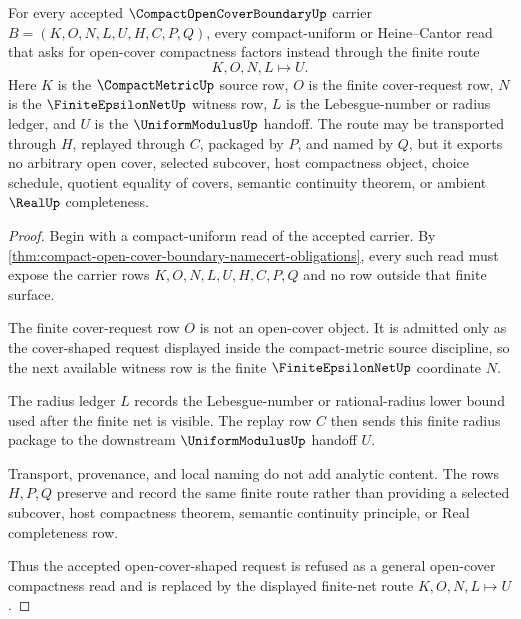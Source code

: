 \begin{theorem}
\label{thm:compact-open-cover-boundary-finite-net-refusal}
For every accepted $\CompactOpenCoverBoundaryUp$ carrier
$B=(K,O,N,L,U,H,C,P,Q)$, every compact-uniform or Heine--Cantor read that asks
for open-cover compactness factors instead through the finite route
$$
K,O,N,L \longmapsto U .
$$
Here $K$ is the $\CompactMetricUp$ source row, $O$ is the finite cover-request
row, $N$ is the $\FiniteEpsilonNetUp$ witness row, $L$ is the
Lebesgue-number or radius ledger, and $U$ is the $\UniformModulusUp$ handoff.
The route may be transported through $H$, replayed through $C$, packaged by
$P$, and named by $Q$, but it exports no arbitrary open cover, selected
subcover, host compactness object, choice schedule, quotient equality of
covers, semantic continuity theorem, or ambient $\RealUp$ completeness.
\end{theorem}
\begin{proof}
Begin with a compact-uniform read of the accepted carrier. By
\autoref{thm:compact-open-cover-boundary-namecert-obligations}, every such
read must expose the carrier rows $K,O,N,L,U,H,C,P,Q$ and no row outside that
finite surface.

The finite cover-request row $O$ is not an open-cover object. It is admitted
only as the cover-shaped request displayed inside the compact-metric source
discipline, so the next available witness row is the finite
$\FiniteEpsilonNetUp$ coordinate $N$.

The radius ledger $L$ records the Lebesgue-number or rational-radius lower
bound used after the finite net is visible. The replay row $C$ then sends this
finite radius package to the downstream $\UniformModulusUp$ handoff $U$.

Transport, provenance, and local naming do not add analytic content. The rows
$H,P,Q$ preserve and record the same finite route rather than providing a
selected subcover, host compactness theorem, semantic continuity principle, or
Real completeness row.

Thus the accepted open-cover-shaped request is refused as a general
open-cover compactness read and is replaced by the displayed finite-net route
$K,O,N,L \longmapsto U$.
\end{proof}


